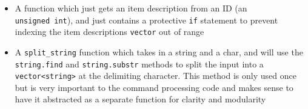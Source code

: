\documentclass[
]{article}
\providecommand{\tightlist}{%
  \setlength{\itemsep}{0pt}\setlength{\parskip}{0pt}}
\begin{document}
\begin{itemize}
\tightlist
\item
  A function which just gets an item description from an ID (an
  \texttt{unsigned\ int}), and just contains a protective \texttt{if}
  statement to prevent indexing the item descriptions \texttt{vector}
  out of range
\item
  A \texttt{split\_string} function which takes in a string and a char,
  and will use the \texttt{string.find} and \texttt{string.substr}
  methods to split the input into a
  \texttt{vector\textless{}string\textgreater{}} at the delimiting
  character. This method is only used once but is very important to the
  command processing code and makes sense to have it abstracted as a
  separate function for clarity and modularity
\end{itemize}
\end{document}
